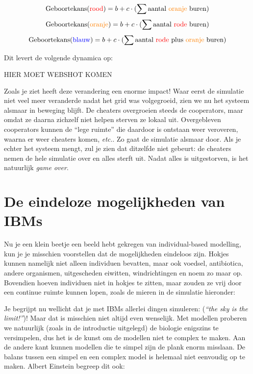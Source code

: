 \documentclass[
  a4paper,
]{scrbook}
\theoremstyle{definition}
\theoremstyle{remark}
\begin{document}
\[ \text{Geboortekans(\color{red}rood\color{black})} = b+c\cdot (\sum{\text{aantal \color{orange}oranje \color{black} buren}})\]
\[\text{Geboortekans(\color{orange}oranje\color{black})} = b+c\cdot (\sum{\text{aantal \color{red} rode \color{black} buren}})\]
\[\text{Geboortekans(\color{blue}blauw\color{black})} = b+c\cdot (\sum{\text{aantal \color{red} rode \color{black} plus \color{orange}oranje \color{black} buren}})\]

Dit levert de volgende dynamica op:

HIER MOET WEBSHOT KOMEN

Zoals je ziet heeft deze verandering een enorme impact! Waar eerst de
simulatie niet veel meer veranderde nadat het grid was volgegroeid, zien
we nu het systeem alsmaar in beweging blijft. De cheaters overgroeien
steeds de cooperators, maar omdat ze daarna zichzelf niet helpen sterven
ze lokaal uit. Overgebleven cooperators kunnen de ``lege ruimte'' die
daardoor is ontstaan weer veroveren, waarna er weer cheaters komen,
\emph{etc.}. Zo gaat de simulatie alsmaar door. Als je echter het
systeem mengt, zul je zien dat ditzelfde niet gebeurt: de cheaters nemen
de hele simulatie over en alles sterft uit. Nadat alles is uitgestorven,
is het natuurlijk \emph{game over}.

\section{De eindeloze mogelijkheden van
IBMs}\label{de-eindeloze-mogelijkheden-van-ibms}

Nu je een klein beetje een beeld hebt gekregen van individual-based
modelling, kun je je misschien voorstellen dat de mogelijkheden
eindeloos zijn. Hokjes kunnen namelijk niet alleen individuen bevatten,
maar ook voedsel, antibiotica, andere organismen, uitgescheden eiwitten,
windrichtingen en noem zo maar op. Bovendien hoeven individuen niet in
hokjes te zitten, maar zouden ze vrij door een continue ruimte kunnen
lopen, zoals de mieren in de simulatie hieronder:

Je begrijpt nu wellicht dat je met IBMs allerlei dingen simuleren:
(\emph{``the sky is the limit!''})! Maar dat is misschien niet altijd
even wenselijk. Met modellen proberen we natuurlijk (zoals in de
introductie uitgelegd) de biologie enigszins te versimpelen, dus het is
de kunst om de modellen niet te complex te maken. Aan de andere kant
kunnen modellen die te simpel zijn de plank enorm misslaan. De balans
tussen een simpel en een complex model is helemaal niet eenvoudig op te
maken. Albert Einstein begreep dit ook:
\end{document}
